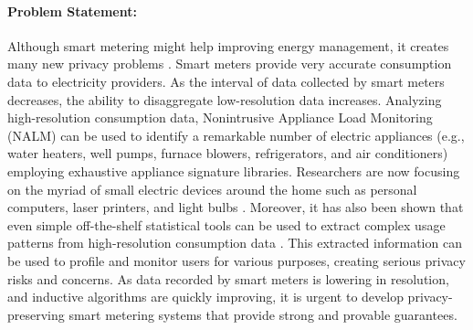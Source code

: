 \documentclass[11pt,a4paper]{article}
\theoremstyle{plain}
\theoremstyle{plain}
\theoremstyle{plain}
\theoremstyle{plain}
\theoremstyle{nonumberplain} \theoremseparator{}
\begin{document}
\paragraph{Problem Statement:}
Although smart metering might help improving energy management, it creates many new privacy problems \cite{anderson10weis}.
Smart meters provide very accurate consumption data to electricity providers.
As the interval of data collected by smart meters decreases, 
the ability to disaggregate low-resolution data increases.  
Analyzing high-resolution consumption data, Nonintrusive Appliance Load Monitoring (NALM) \cite{hart92ieee} can be used to identify a remarkable number of electric
appliances (e.g., water heaters, well pumps, furnace
blowers, refrigerators, and air conditioners) employing exhaustive appliance signature libraries. Researchers are now focusing on the myriad
of small electric devices around the home such as personal computers,
laser printers, and light bulbs \cite{Lam07trans}. Moreover, it has also been shown that even simple off-the-shelf statistical tools can be used to extract complex usage patterns from high-resolution consumption data \cite{Molina10buildsys}.
This extracted information can be used to profile and monitor users
for various purposes, creating serious privacy risks and concerns.  
As data recorded by smart
meters is lowering in resolution, and inductive algorithms are quickly improving, it is urgent
to develop privacy-preserving smart metering systems that provide strong and provable 
guarantees.
\end{document}
